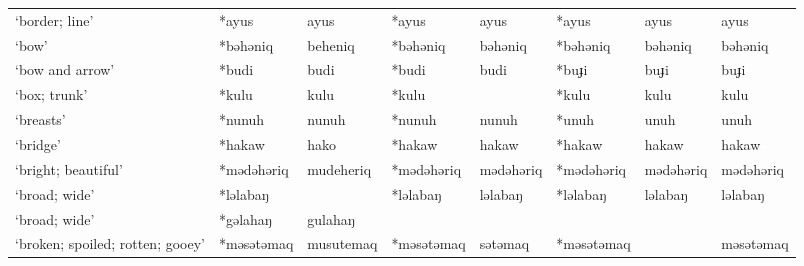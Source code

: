 \begin{landscape}
\begin{longtable}[c]{@{}p{3cm}<{\raggedright}p{2.75cm}<{\raggedright}p{2.75cm}<{\raggedright}p{2.75cm}<{\raggedright}p{2.75cm}<{\raggedright}p{2.75cm}<{\raggedright}p{2.75cm}<{\raggedright}p{2.75cm}<{\raggedright}@{}}
`border; line'                                       & *ayus              & ayus                           & *ayus              & ayus                       & *ayus            & ayus                     & ayus                              \\
`bow'                                                & *bəhəniq           & beheniq                        & *bəhəniq           & bəhəniq                    & *bəhəniq         & bəhəniq                  & bəhəniq                           \\
`bow and arrow'                                      & *budi              & budi                           & *budi              & budi                       & *buɟi            & buɟi                     & buɟi                              \\
`box; trunk'                                         & *kulu              & kulu                           & *kulu              &                            & *kulu            & kulu                     & kulu                              \\
`breasts'                                            & *nunuh             & nunuh                          & *nunuh             & nunuh                      & *unuh            & unuh                     & unuh                              \\
`bridge'                                             & *hakaw             & hako                           & *hakaw             & hakaw                      & *hakaw           & hakaw                    & hakaw                             \\
`bright; beautiful'                                  & *mədəhəriq         & mudeheriq                      & *mədəhəriq         & mədəhəriq                  & *mədəhəriq       & mədəhəriq                & mədəhəriq                         \\
`broad; wide'                                        & *ləlabaŋ           &                                & *ləlabaŋ           & ləlabaŋ                    & *ləlabaŋ         & ləlabaŋ                  & ləlabaŋ                           \\
`broad; wide'                                        & *gəlahaŋ           & gulahaŋ                        &                    &                            &                  &                          &                                   \\
`broken; spoiled; rotten; gooey'                     & *məsətəmaq         & musutemaq                      & *məsətəmaq         & sətəmaq                    & *məsətəmaq       &                          & məsətəmaq                         \\

\end{longtable}
\end{landscape}
